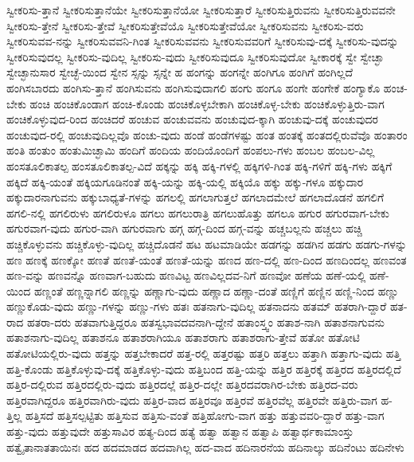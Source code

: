 {ಸ್ವೀಕರಿಸು-ತ್ತಾನೆ
ಸ್ವೀಕರಿಸುತ್ತಾನೆಯೇ
ಸ್ವೀಕರಿಸುತ್ತಾನೆಯೋ
ಸ್ವೀಕರಿಸುತ್ತಾರೆ
ಸ್ವೀಕರಿಸುತ್ತಿರುವನು
ಸ್ವೀಕರಿಸುತ್ತಿರುವವನೇ
ಸ್ವೀಕರಿಸು-ತ್ತೇನೆ
ಸ್ವೀಕರಿಸು-ತ್ತೇವೆ
ಸ್ವೀಕರಿಸುತ್ತೇವೆಯೊ
ಸ್ವೀಕರಿಸುತ್ತೇವೆಯೋ
ಸ್ವೀಕರಿಸುವನು
ಸ್ವೀಕರಿಸು-ವರು
ಸ್ವೀಕರಿಸುವವ-ನನ್ನು
ಸ್ವೀಕರಿಸುವವನಿ-ಗಿಂತ
ಸ್ವೀಕರಿಸುವವನು
ಸ್ವೀಕರಿಸುವವರಿಗೆ
ಸ್ವೀಕರಿಸುವು-ದಕ್ಕೆ
ಸ್ವೀಕರಿಸು-ವುದನ್ನು
ಸ್ವೀಕರಿಸುವುದಲ್ಲ
ಸ್ವೀಕರಿಸು-ವುದಿಲ್ಲ
ಸ್ವೀಕರಿಸು-ವುದು
ಸ್ವೀಕರಿಸುವುದೂ
ಸ್ವೀಕರಿಸುವುದೋ
ಸ್ವೀಕಾರಕ್ಕೆ
ಸ್ವೇ
ಸ್ವೇಚ್ಛಾ
ಸ್ವೇಚ್ಛಾನುಸಾರ
ಸ್ವೇಚ್ಛೆ-ಯಿಂದ
ಸ್ವೇನ
ಸ್ಸನ್ನು
ಸ್ಸನ್ನೇ
ಹ
ಹಂಗನ್ನು
ಹಂಗನ್ನೇ
ಹಂಗಿಗೂ
ಹಂಗಿಗೆ
ಹಂಗಿಲ್ಲದೆ
ಹಂಗಿಸಬಾರದು
ಹಂಗಿಸು-ತ್ತಾನೆ
ಹಂಗಿಸುವನು
ಹಂಗಿಸುವುದಾಗಲಿ
ಹಂಗು
ಹಂಗೂ
ಹಂಗೇ
ಹಂಗೇಕೆ
ಹಂಗ್ಯಾಕೊ
ಹಂಚ-ಬೇಕು
ಹಂಚಿ
ಹಂಚಿಕೊಂಡಾಗ
ಹಂಚಿ-ಕೊಂಡು
ಹಂಚಿಕೊಳ್ಳಬೇಕಾಗಿ
ಹಂಚಿಕೊಳ್ಳ-ಬೇಕು
ಹಂಚಿಕೊಳ್ಳುತ್ತಿರು-ವಾಗ
ಹಂಚಿಕೊಳ್ಳುವುದ-ರಿಂದ
ಹಂಚಿದರೆ
ಹಂಚುವ
ಹಂಚುವವನು
ಹಂಚುವುದ-ಕ್ಕಾಗಿ
ಹಂಚುವು-ದಕ್ಕೆ
ಹಂಚುವುದರ
ಹಂಚುವುದ-ರಲ್ಲಿ
ಹಂಚುವುದಿಲ್ಲವೊ
ಹಂಚು-ವುದು
ಹಂಡೆ
ಹಂಡೆಗಳಷ್ಟು
ಹಂತ
ಹಂತಕ್ಕೆ
ಹಂತದಲ್ಲಿರುವೆವೊ
ಹಂತಾರಂ
ಹಂತಿ
ಹಂತುಂ
ಹಂತುಮಿಚ್ಛಾಮಿ
ಹಂದಿಗೆ
ಹಂದಿಯ
ಹಂದಿಯೊಂದಿಗೆ
ಹಂಪಲು-ಗಳು
ಹಂಬಲ
ಹಂಬಲ-ವಿಲ್ಲ
ಹಂಸತೂಲಿಕಾತಲ್ಪ
ಹಂಸತೂಲಿಕಾತಲ್ಪ-ವಿದೆ
ಹಕ್ಕನ್ನು
ಹಕ್ಕಿ
ಹಕ್ಕಿ-ಗಳಲ್ಲಿ
ಹಕ್ಕಿಗಳಿ-ಗಿಂತ
ಹಕ್ಕಿ-ಗಳಿಗೆ
ಹಕ್ಕಿ-ಗಳು
ಹಕ್ಕಿಗೆ
ಹಕ್ಕಿದೆ
ಹಕ್ಕಿ-ಯಂತೆ
ಹಕ್ಕಿಯಗೂಡಿನಂತೆ
ಹಕ್ಕಿ-ಯನ್ನು
ಹಕ್ಕಿ-ಯಲ್ಲಿ
ಹಕ್ಕಿಯೊ
ಹಕ್ಕು
ಹಕ್ಕು-ಗಳೂ
ಹಕ್ಕುದಾರ
ಹಕ್ಕುದಾರನಾಗುವನು
ಹಕ್ಕುಬಾಧ್ಯತೆ-ಗಳನ್ನು
ಹಗಲಲ್ಲಿ
ಹಗಲಾಗುತ್ತಲೆ
ಹಗಲಾದಮೇಲೆ
ಹಗಲಾದೊಡನೆ
ಹಗಲಿಗೆ
ಹಗಲಿ-ನಲ್ಲಿ
ಹಗಲಿರುಳು
ಹಗಲಿರುಳೂ
ಹಗಲು
ಹಗಲುರಾತ್ರಿ
ಹಗಲುಹೊತ್ತು
ಹಗಲೂ
ಹಗುರ
ಹಗುರವಾಗ-ಬೇಕು
ಹಗುರವಾಗ-ವುದು
ಹಗುರ-ವಾಗಿ
ಹಗುರವಾಗು
ಹಗ್ಗ
ಹಗ್ಗ-ದಿಂದ
ಹಗ್ಗ-ವನ್ನು
ಹಚ್ಚಬಲ್ಲನು
ಹಚ್ಚಲು
ಹಚ್ಚಿ
ಹಚ್ಚಿಕೊಳ್ಳುವನು
ಹಚ್ಚಿಕೊಳ್ಳು-ವುದಿಲ್ಲ
ಹಚ್ಚಿದೊಡನೆ
ಹಟ
ಹಟಮಾಡಿಯೇ
ಹಡಗನ್ನು
ಹಡಗಿನ
ಹಡಗು
ಹಡಗು-ಗಳನ್ನು
ಹಣ
ಹಣಕ್ಕೆ
ಹಣಕ್ಕೋ
ಹಣತೆ
ಹಣತೆ-ಯಂತೆ
ಹಣತೆ-ಯನ್ನು
ಹಣದ
ಹಣ-ದಲ್ಲಿ
ಹಣ-ದಿಂದ
ಹಣದಿಂದಲ್ಲ
ಹಣವಂತ
ಹಣ-ವನ್ನು
ಹಣವನ್ನೊ
ಹಣವಾಗ-ಬಹುದು
ಹಣವಿಟ್ಟ
ಹಣವಿಲ್ಲದವ-ನಿಗೆ
ಹಣವೋ
ಹಣೆಯ
ಹಣೆ-ಯಲ್ಲಿ
ಹಣೆ-ಯಿಂದ
ಹಣ್ಣಂತೆ
ಹಣ್ಣನ್ನಾಗಲಿ
ಹಣ್ಣನ್ನು
ಹಣ್ಣಾಗು-ವುದು
ಹಣ್ಣಾದ
ಹಣ್ಣಾ-ದಂತೆ
ಹಣ್ಣಿಗೆ
ಹಣ್ಣಿನ
ಹಣ್ಣಿ-ನಿಂದ
ಹಣ್ಣು
ಹಣ್ಣುಕೊಡು-ವುದು
ಹಣ್ಣು-ಗಳನ್ನು
ಹಣ್ಣು-ಗಳು
ಹತಃ
ಹತನಾಗು-ವುದಿಲ್ಲ
ಹತನಾದನು
ಹತಮ್
ಹತರಾಗಿ-ದ್ದಾರೆ
ಹತ-ರಾದ
ಹತರಾ-ದರು
ಹತವಾಗುತ್ತಿದ್ದರೂ
ಹತಸ್ವಭಾವದವನಾಗಿ-ದ್ದೇನೆ
ಹತಾಂಸ್ತ್ವಂ
ಹತಾಶ-ನಾಗಿ
ಹತಾಶನಾಗುವನು
ಹತಾಶನಾಗು-ವುದಿಲ್ಲ
ಹತಾಶನೂ
ಹತಾಶರಾಗಿಯೂ
ಹತಾಶರಾಗು
ಹತಾಶರಾಗು-ತ್ತೇವೆ
ಹತೋ
ಹತೋಟಿ
ಹತೋಟಿಯಲ್ಲಿರು-ವುದು
ಹತ್ತನ್ನು
ಹತ್ತಬೇಕಾದರೆ
ಹತ್ತ-ರಲ್ಲಿ
ಹತ್ತರಷ್ಟು
ಹತ್ತರಿ
ಹತ್ತಲು
ಹತ್ತಾಗಿ
ಹತ್ತಾಗು-ವುದು
ಹತ್ತಿ
ಹತ್ತಿ-ಕೊಂಡು
ಹತ್ತಿಕೊಳ್ಳುವು-ದಕ್ಕೆ
ಹತ್ತಿಕೊಳ್ಳು-ವುದು
ಹತ್ತಿಬಂದ
ಹತ್ತಿ-ಯನ್ನು
ಹತ್ತಿರ
ಹತ್ತಿರಕ್ಕೆ
ಹತ್ತಿರದ
ಹತ್ತಿರದಲ್ಲಿದೆ
ಹತ್ತಿರ-ದಲ್ಲಿರುವ
ಹತ್ತಿರದಲ್ಲಿರು-ವುದು
ಹತ್ತಿರದಲ್ಲೆ
ಹತ್ತಿರ-ದಲ್ಲೇ
ಹತ್ತಿರದವರಾಗಿರ-ಬೇಕು
ಹತ್ತಿರದ-ವರು
ಹತ್ತಿರವಾಗಿದ್ದರೂ
ಹತ್ತಿರವಾಗಿರು-ವುದು
ಹತ್ತಿರ-ವಾದ
ಹತ್ತಿರವೂ
ಹತ್ತಿರವೆ
ಹತ್ತಿರವೆಲ್ಲ
ಹತ್ತಿರವೇ
ಹತ್ತಿರು-ವಾಗ
ಹ-ತ್ತಿಲ್ಲ
ಹತ್ತಿಸದೆ
ಹತ್ತಿಸಲ್ಪಟ್ಟಿತು
ಹತ್ತಿಸುವ
ಹತ್ತಿಸು-ವಂತೆ
ಹತ್ತಿಹೋಗು-ವಾಗ
ಹತ್ತು
ಹತ್ತುವವರಿ-ದ್ದಾರೆ
ಹತ್ತು-ವಾಗ
ಹತ್ತು-ವುದು
ಹತ್ತುವುದೇ
ಹತ್ತುಸಾವಿರ
ಹತ್ಯ-ದಿಂದ
ಹತ್ಯೆ
ಹತ್ವಾ
ಹತ್ವಾನ
ಹತ್ವಾಪಿ
ಹತ್ವಾರ್ಥಕಾಮಾಂಸ್ತು
ಹತ್ವೈತಾನಾತತಾಯಿನಃ
ಹದ
ಹದಮಾಡದ
ಹದವಾಗಿಲ್ಲ
ಹದ-ವಾದ
ಹದಿನಾರನೆಯ
ಹದಿನಾಲ್ಕು
ಹದಿನೆಂಟು
ಹದಿನೇಳು
}
